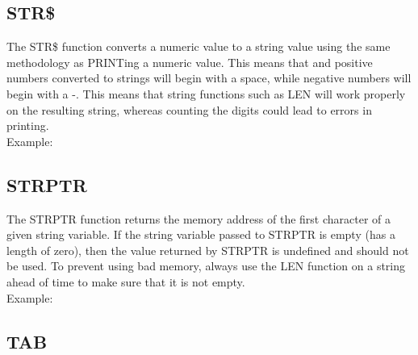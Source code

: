 \subsection{STR\$}

The {\ttfamily STR\$} function converts a numeric value to a string value using
the same methodology as {\ttfamily PRINT}ing a numeric value.  This means that
{} and positive numbers converted to strings will begin with a
space, while negative numbers will begin with a {\ttfamily -}.  This means that
string functions such as {\ttfamily LEN} will work properly on the resulting
string, whereas counting the digits could lead to errors in printing.\\

Example:\\


\subsection{STRPTR}

The {\ttfamily STRPTR} function returns the memory address of the first
character of a given string variable.  If the string variable passed to
{\ttfamily STRPTR} is empty (has a length of zero), then the value returned by
{\ttfamily STRPTR} is undefined and should not be used.  To prevent using bad
memory, always use the {\ttfamily LEN} function on a string ahead of time to
make sure that it is not empty.\\

Example:\\


\subsection{TAB}

